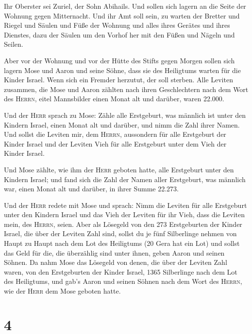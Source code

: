  Ihr Oberster sei Zuriel, der Sohn Abihails. Und sollen
sich lagern an die Seite der Wohnung gegen Mitternacht. 
Und ihr Amt soll sein, zu warten der Bretter und Riegel und Säulen und
Füße der Wohnung und alles ihres Gerätes und ihres Dienstes,
 dazu der Säulen um den Vorhof her mit den Füßen und
Nägeln und Seilen.

 Aber vor der Wohnung und vor der Hütte des Stifts gegen
Morgen sollen sich lagern Mose und Aaron und seine Söhne, dass sie des
Heiligtums warten für die Kinder Israel. Wenn sich ein Fremder herzutut,
der soll sterben.  Alle Leviten zusammen, die Mose und
Aaron zählten nach ihren Geschlechtern nach dem Wort des \textsc{Herrn},
eitel Mannsbilder einen Monat alt und darüber, waren 22.000.

 Und der \textsc{Herr} sprach zu Mose: Zähle alle
Erstgeburt, was männlich ist unter den Kindern Israel, einen Monat alt
und darüber, und nimm die Zahl ihrer Namen.  Und sollst
die Leviten mir, dem \textsc{Herrn}, aussondern für alle Erstgeburt der
Kinder Israel und der Leviten Vieh für alle Erstgeburt unter dem Vieh
der Kinder Israel.

 Und Mose zählte, wie ihm der \textsc{Herr} geboten
hatte, alle Erstgeburt unter den Kindern Israel;  und
fand sich die Zahl der Namen aller Erstgeburt, was männlich war, einen
Monat alt und darüber, in ihrer Summe 22.273.

 Und der \textsc{Herr} redete mit Mose und sprach:
 Nimm die Leviten für alle Erstgeburt unter den Kindern
Israel und das Vieh der Leviten für ihr Vieh, dass die Leviten mein, des
\textsc{Herrn}, seien.  Aber als Lösegeld von den 273
Erstgeburten der Kinder Israel, die über der Leviten Zahl sind,
 sollst du je fünf Silberlinge nehmen von Haupt zu Haupt
nach dem Lot des Heiligtums (20 Gera hat ein Lot)  und
sollst das Geld für die, die überzählig sind unter ihnen, geben Aaron
und seinen Söhnen.  Da nahm Mose das Lösegeld von denen,
die über der Leviten Zahl waren,  von den Erstgeburten
der Kinder Israel, 1365 Silberlinge nach dem Lot des Heiligtums,
 und gab's Aaron und seinen Söhnen nach dem Wort des
\textsc{Herrn}, wie der \textsc{Herr} dem Mose geboten hatte.

\hypertarget{section-3}{%
\section{4}\label{section-3}}


